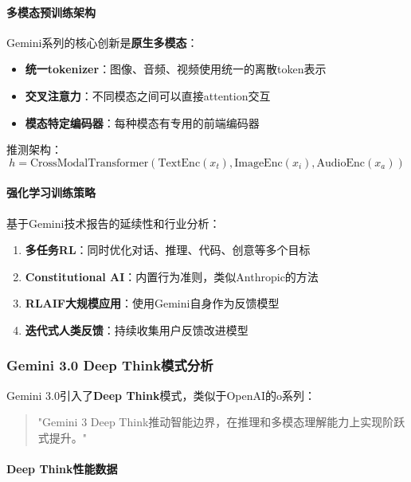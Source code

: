 \documentclass[12pt,a4paper]{article}
\begin{document}
\paragraph{多模态预训练架构}

Gemini系列的核心创新是\textbf{原生多模态}：

\begin{itemize}
    \item \textbf{统一tokenizer}：图像、音频、视频使用统一的离散token表示
    \item \textbf{交叉注意力}：不同模态之间可以直接attention交互
    \item \textbf{模态特定编码器}：每种模态有专用的前端编码器
\end{itemize}

推测架构：
\begin{equation}
h = \text{CrossModalTransformer}(\text{TextEnc}(x_t), \text{ImageEnc}(x_i), \text{AudioEnc}(x_a))
\end{equation}

\paragraph{强化学习训练策略}

基于Gemini技术报告的延续性和行业分析：

\begin{enumerate}
    \item \textbf{多任务RL}：同时优化对话、推理、代码、创意等多个目标
    \item \textbf{Constitutional AI}：内置行为准则，类似Anthropic的方法
    \item \textbf{RLAIF大规模应用}：使用Gemini自身作为反馈模型
    \item \textbf{迭代式人类反馈}：持续收集用户反馈改进模型
\end{enumerate}

\subsubsection{Gemini 3.0 Deep Think模式分析}

Gemini 3.0引入了\textbf{Deep Think}模式，类似于OpenAI的o系列：

\begin{quote}
"Gemini 3 Deep Think推动智能边界，在推理和多模态理解能力上实现阶跃式提升。"
\end{quote}

\paragraph{Deep Think性能数据}
\end{document}
